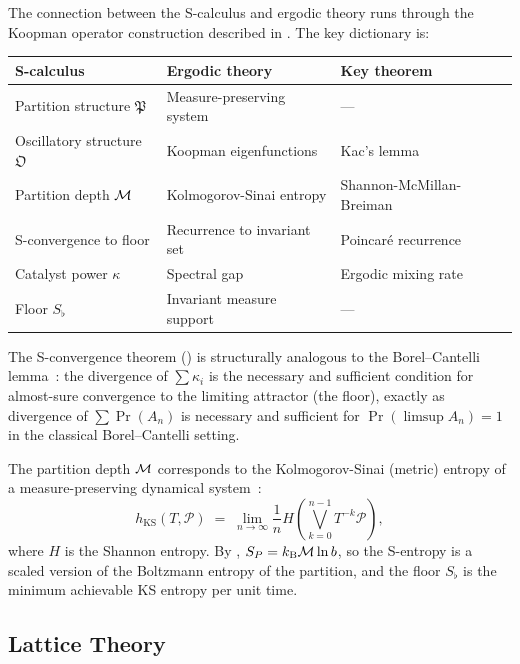 The connection between the S-calculus and ergodic theory runs through the
Koopman operator construction described in .  The key
dictionary is:

\begin{center}
\renewcommand{\arraystretch}{1.3}
\begin{tabular}{lll}
\toprule
\textbf{S-calculus} & \textbf{Ergodic theory} & \textbf{Key theorem} \\
\midrule
Partition structure $\mathfrak{P}$ & Measure-preserving system & --- \\
Oscillatory structure $\mathfrak{O}$ & Koopman eigenfunctions & Kac's lemma \\
Partition depth $\mathcal{M}$ & Kolmogorov-Sinai entropy & Shannon-McMillan-Breiman \\
S-convergence to floor & Recurrence to invariant set & Poincar\'{e} recurrence \\
Catalyst power $\kappa$ & Spectral gap & Ergodic mixing rate \\
Floor $S_\flat$ & Invariant measure support & --- \\
\bottomrule
\end{tabular}
\end{center}

The S-convergence theorem () is structurally
analogous to the Borel--Cantelli lemma~\citep{Billingsley1995}: the
divergence of $\sum \kappa_i$ is the necessary and sufficient condition for
almost-sure convergence to the limiting attractor (the floor), exactly as
divergence of $\sum \Pr(A_n)$ is necessary and sufficient for
$\Pr(\limsup A_n) = 1$ in the classical Borel--Cantelli setting.

The partition depth $\mathcal{M}$ corresponds to the Kolmogorov-Sinai (metric)
entropy of a measure-preserving dynamical system~\citep{Billingsley1995}:
\[
  h_{\mathrm{KS}}(T, \mathscr{P})
  \;=\; \lim_{n \to \infty} \frac{1}{n} H\!\left(
    \bigvee_{k=0}^{n-1} T^{-k} \mathscr{P} \right) ,
\]
where $H$ is the Shannon entropy.  By ,
$S_P = k_{\mathrm{B}} \mathcal{M} \ln b$, so the S-entropy is a scaled version of the
Boltzmann entropy of the partition, and the floor $S_\flat$ is the
minimum achievable KS entropy per unit time.

\subsection{Lattice Theory}
\label{subsec:lattice}

